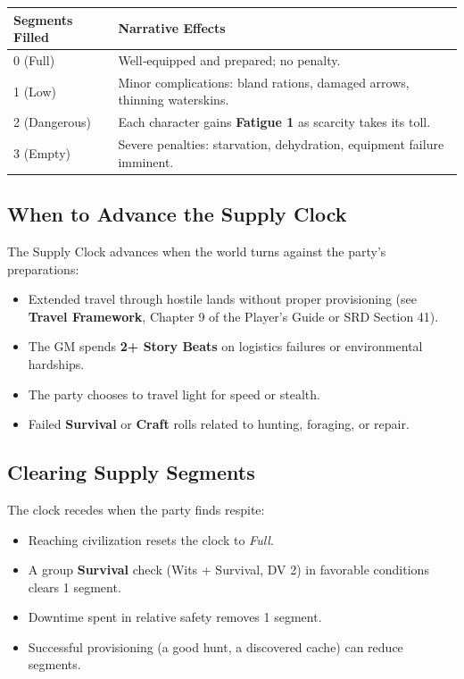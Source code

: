 \begin{tcolorbox}[title=Supply Clock Conditions, colback=white!97!gray, colframe=black!80!gray]
\begin{tabularx}{\textwidth}{lX}
\toprule
\textbf{Segments Filled} & \textbf{Narrative Effects} \\
\midrule
0 (Full) & Well‑equipped and prepared; no penalty. \\
1 (Low) & Minor complications: bland rations, damaged arrows, thinning waterskins. \\
2 (Dangerous) & Each character gains \textbf{Fatigue 1} as scarcity takes its toll. \\
3 (Empty) & Severe penalties: starvation, dehydration, equipment failure imminent. \\
\bottomrule
\end{tabularx}
\end{tcolorbox}

\subsection{When to Advance the Supply Clock}
\label{subsec:supply-advance}

The Supply Clock advances when the world turns against the party’s preparations:
\begin{itemize}
  \item Extended travel through hostile lands without proper provisioning (see \textbf{Travel Framework}, Chapter 9 of the Player’s Guide or SRD Section 41).
  \item The GM spends \textbf{2+ Story Beats} on logistics failures or environmental hardships.
  \item The party chooses to travel light for speed or stealth.
  \item Failed \textbf{Survival} or \textbf{Craft} rolls related to hunting, foraging, or repair.
\end{itemize}

\subsection{Clearing Supply Segments}
\label{subsec:supply-clear}

The clock recedes when the party finds respite:
\begin{itemize}
  \item Reaching civilization resets the clock to \textit{Full}.
  \item A group \textbf{Survival} check (Wits + Survival, DV 2) in favorable conditions clears 1 segment.
  \item Downtime spent in relative safety removes 1 segment.
  \item Successful provisioning (a good hunt, a discovered cache) can reduce segments.
\end{itemize}


